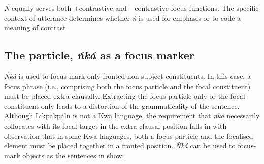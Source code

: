 \documentclass[output=paper,colorlinks,citecolor=brown]{langscibook}
\begin{document}
\ea%
    \label{ex:bisilki:12}
    \z
\z

\textit{Ń} equally serves both +contrastive and −contrastive focus functions. The specific context of utterance determines whether \textit{ń} is used for emphasis or to code a meaning of contrast.

\subsection{The particle, \textit{ńká} as a focus marker}\label{sec:bisilki:5.2}

\textit{Ńká} is used to focus-mark only fronted non-subject constituents. In this case, a focus phrase (i.e., comprising both the focus particle and the focal constituent) must be placed extra-clausally. Extracting the focus particle only or the focal constituent only leads to a distortion of the grammaticality of the sentence. Although Līkpākpáln is not a Kwa language, the requirement that \textit{ńká} necessarily collocates with its focal target in the extra-clausal position falls in with  observation that in some Kwa languages, both a focus particle and the focalised element must be placed together in a fronted position. \textit{Ńká} can be used to focus-mark objects as the sentences in  show:
\end{document}
